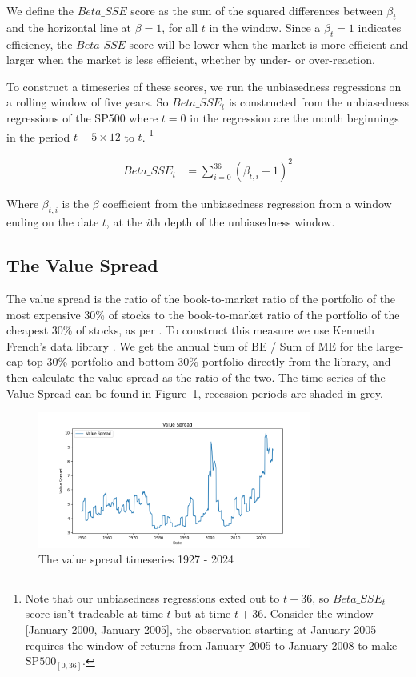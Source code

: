 We define the $Beta\_SSE$ score as the sum of the squared differences between $\beta_t$ and the horizontal line at $\beta = 1$, for all $t$ in the window.
Since a $\beta_t = 1$ indicates efficiency, the $Beta\_SSE$ score will be lower when the market is more efficient and larger when the market is less efficient, whether by under- or over-reaction.

To construct a timeseries of these scores, we run the unbiasedness regressions on a rolling window of five years.
So $Beta\_SSE_t$ is constructed from the unbiasedness regressions of the SP500 where $t=0$ in the regression are the month beginnings in the period
$t - 5 \times 12$ to $t$.
\footnote{Note that our unbiasedness regressions exted out to $t+36$, so $Beta\_SSE_t$ score isn't tradeable at time $t$ but at time $t+36$. Consider the window [January 2000, January 2005], the observation starting at January 2005 requires the window of returns from January 2005 to January 2008 to make $\mathrm{SP500}_{[0, 36]}$.}

\begin{equation}
    \begin{aligned}
        Beta\_SSE_t &= \sum_{i=0}^{36} (\beta_{t,i} - 1)^2
    \end{aligned}
\end{equation}

Where $\beta_{t,i}$ is the $\beta$ coefficient from the unbiasedness regression from a 
window ending on the date $t$, at the $i$th depth of the unbiasedness window.


\subsection{The Value Spread}

The value spread is the ratio of the book-to-market ratio of the portfolio of the most expensive 30\% of stocks to the book-to-market ratio of the portfolio of the cheapest 30\% of stocks, as per \citet{fama_french_1993}.
To construct this measure we use Kenneth French's data library \citep{french_website}. 
We get the annual Sum of BE / Sum of ME for the large-cap top $30\%$ portfolio and bottom $30\%$ portfolio directly from the library, and then calculate the value spread as the ratio of the two. The time series of the Value Spread can be found in
 Figure~\ref{fig:value_spread}, recession periods are shaded in grey.

\begin{figure}[h!]
    \centering
    \includegraphics[width=0.8\textwidth]{../figs/Value Spread.png}
    \caption{The value spread timeseries 1927 - 2024}
    \label{fig:value_spread}
\end{figure}
